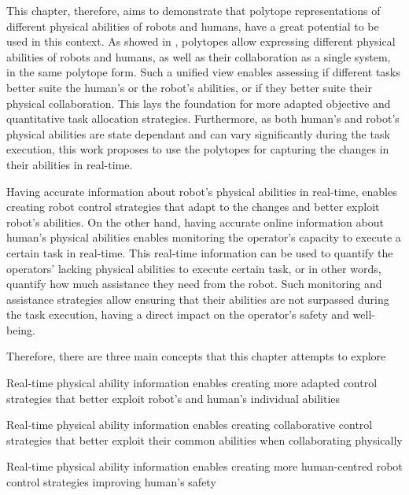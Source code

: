 This chapter, therefore, aims to demonstrate that polytope representations of different physical abilities of robots and humans, have a great potential to be used in this context. As showed in , polytopes allow expressing different physical abilities of robots and humans, as well as their collaboration as a single system, in the same polytope form. Such  a unified view enables assessing if different tasks better suite the human's or the robot's abilities, or if they better suite their physical collaboration. This lays the foundation for more adapted objective and quantitative task allocation strategies. Furthermore, as both human's and robot's physical abilities are state dependant and can vary significantly during the task execution, this work proposes to use the polytopes for capturing the changes in their abilities in real-time. 

Having accurate information about robot's physical abilities in real-time, enables creating robot control strategies that adapt to the changes and better exploit robot's abilities. On the other hand, having accurate online information about human's physical abilities enables monitoring the operator's capacity to execute a certain task in real-time. This real-time information can be used to quantify the operators' lacking physical abilities to execute certain task, or in other words, quantify how much assistance they need from the robot. Such monitoring and assistance strategies allow ensuring that their abilities are not surpassed during the task execution, having a direct impact on the operator's safety and well-being. 


Therefore, there are three main concepts that this chapter attempts to explore 
\begin{concept} \label{hyp:individual_capacity} Real-time physical ability information enables creating more adapted control strategies that better exploit robot's and human's individual abilities
\end{concept}

\begin{concept} \label{hyp:common_capacity} Real-time physical ability information enables creating  collaborative control strategies that better exploit their common abilities when collaborating physically
\end{concept}

\begin{concept} \label{hyp:safety} Real-time physical ability information enables creating  more human-centred robot control strategies improving human's safety
\end{concept}


